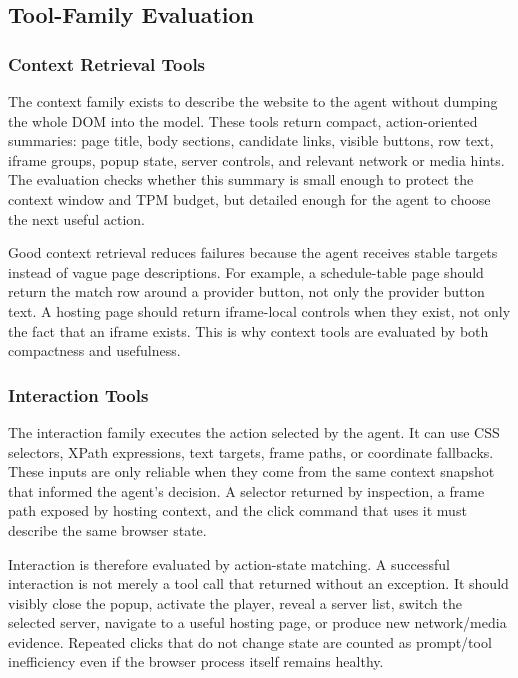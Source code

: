 \subsection{Tool-Family Evaluation}

\subsubsection{Context Retrieval Tools}

The context family exists to describe the website to the agent without dumping the whole
DOM into the model. These tools return compact, action-oriented summaries: page title,
body sections, candidate links, visible buttons, row text, iframe groups, popup state,
server controls, and relevant network or media hints. The evaluation checks whether this
summary is small enough to protect the context window and TPM budget, but detailed enough
for the agent to choose the next useful action.

Good context retrieval reduces failures because the agent receives stable targets instead
of vague page descriptions. For example, a schedule-table page should return the match
row around a provider button, not only the provider button text. A hosting page should
return iframe-local controls when they exist, not only the fact that an iframe exists.
This is why context tools are evaluated by both compactness and usefulness.

\subsubsection{Interaction Tools}

The interaction family executes the action selected by the agent. It can use CSS
selectors, XPath expressions, text targets, frame paths, or coordinate fallbacks. These
inputs are only reliable when they come from the same context snapshot that informed the
agent's decision. A selector returned by inspection, a frame path exposed by hosting
context, and the click command that uses it must describe the same browser state.

Interaction is therefore evaluated by action-state matching. A successful interaction is
not merely a tool call that returned without an exception. It should visibly close the
popup, activate the player, reveal a server list, switch the selected server, navigate to
a useful hosting page, or produce new network/media evidence. Repeated clicks that do not
change state are counted as prompt/tool inefficiency even if the browser process itself
remains healthy.

